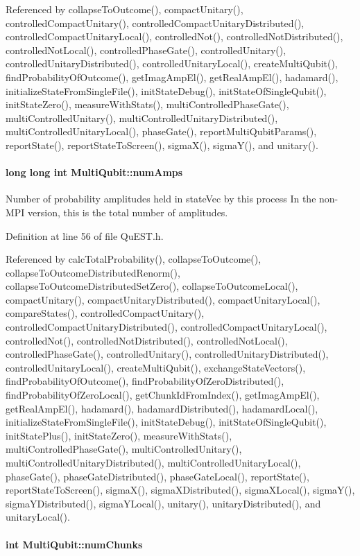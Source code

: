 Referenced by collapseToOutcome(), compactUnitary(), controlledCompactUnitary(), controlledCompactUnitaryDistributed(), controlledCompactUnitaryLocal(), controlledNot(), controlledNotDistributed(), controlledNotLocal(), controlledPhaseGate(), controlledUnitary(), controlledUnitaryDistributed(), controlledUnitaryLocal(), createMultiQubit(), findProbabilityOfOutcome(), getImagAmpEl(), getRealAmpEl(), hadamard(), initializeStateFromSingleFile(), initStateDebug(), initStateOfSingleQubit(), initStateZero(), measureWithStats(), multiControlledPhaseGate(), multiControlledUnitary(), multiControlledUnitaryDistributed(), multiControlledUnitaryLocal(), phaseGate(), reportMultiQubitParams(), reportState(), reportStateToScreen(), sigmaX(), sigmaY(), and unitary().\hypertarget{structMultiQubit_ae16f47d8b725c914fb7f66b6498d79db}{
\paragraph[{numAmps}]{\setlength{\rightskip}{0pt plus 5cm}long long int {\bf MultiQubit::numAmps}}\hfill}
\label{structMultiQubit_ae16f47d8b725c914fb7f66b6498d79db}


Number of probability amplitudes held in stateVec by this process In the non-\/MPI version, this is the total number of amplitudes. 

Definition at line 56 of file QuEST.h.

Referenced by calcTotalProbability(), collapseToOutcome(), collapseToOutcomeDistributedRenorm(), collapseToOutcomeDistributedSetZero(), collapseToOutcomeLocal(), compactUnitary(), compactUnitaryDistributed(), compactUnitaryLocal(), compareStates(), controlledCompactUnitary(), controlledCompactUnitaryDistributed(), controlledCompactUnitaryLocal(), controlledNot(), controlledNotDistributed(), controlledNotLocal(), controlledPhaseGate(), controlledUnitary(), controlledUnitaryDistributed(), controlledUnitaryLocal(), createMultiQubit(), exchangeStateVectors(), findProbabilityOfOutcome(), findProbabilityOfZeroDistributed(), findProbabilityOfZeroLocal(), getChunkIdFromIndex(), getImagAmpEl(), getRealAmpEl(), hadamard(), hadamardDistributed(), hadamardLocal(), initializeStateFromSingleFile(), initStateDebug(), initStateOfSingleQubit(), initStatePlus(), initStateZero(), measureWithStats(), multiControlledPhaseGate(), multiControlledUnitary(), multiControlledUnitaryDistributed(), multiControlledUnitaryLocal(), phaseGate(), phaseGateDistributed(), phaseGateLocal(), reportState(), reportStateToScreen(), sigmaX(), sigmaXDistributed(), sigmaXLocal(), sigmaY(), sigmaYDistributed(), sigmaYLocal(), unitary(), unitaryDistributed(), and unitaryLocal().\hypertarget{structMultiQubit_acd43f2f57991709c9e94f73662c972b2}{
\paragraph[{numChunks}]{\setlength{\rightskip}{0pt plus 5cm}int {\bf MultiQubit::numChunks}}\hfill}
\label{structMultiQubit_acd43f2f57991709c9e94f73662c972b2}


